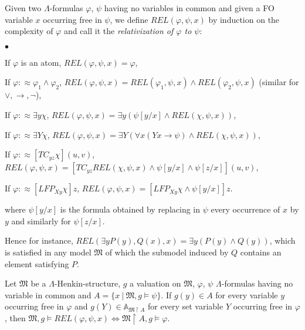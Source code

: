 \documentclass{LMCS}
\newcommand{\frM}{\mathfrak{M}}
\newcommand{\fo}{\textsf{FO}\xspace}
\begin{document}
\begin{defi}
Given two $\Lambda$-formulas $\varphi$, $\psi$ having no variables
in common and given a \fo variable $x$ occurring free in $\psi$,
we define $REL(\varphi,\psi,x)$ by induction on the complexity of
$\varphi$ and call it the \emph{relativization of $\varphi$ to
$\psi$}:
\begin{iteMize}{$\bullet$}
 \item If $\varphi$ is an atom, $REL(\varphi,\psi,x)=\varphi$,
 \item If $\varphi:\approx\varphi_1 \wedge \varphi_2$, $REL(\varphi,\psi,x)=REL(\varphi_1,\psi,x) \wedge REL(\varphi_2,\psi,x)$ (similar for $\vee, \rightarrow, \neg$),
 \item If $\varphi:\approx\exists y \chi$, $REL(\varphi,\psi,x)=\exists y (\psi[y/x] \land REL(\chi,\psi,x))$,
 \item If $\varphi:\approx\exists Y \chi$, $REL(\varphi,\psi,x)=\exists Y (\forall x(Yx \rightarrow \psi) \land REL(\chi,\psi,x))$,
 \item If $\varphi:\approx[TC_{yz}\chi](u,v)$,\\
  $REL(\varphi,\psi,x)=[TC_{yz} REL(\chi,\psi,x) \wedge \psi[y/x] \wedge \psi[z/x]](u,v)$,
 \item If $\varphi:\approx[LFP_{Xy}\chi]z$, $REL(\varphi,\psi,x)= [LFP_{Xy}\chi \wedge\psi[y/x]]z$.
\end{iteMize}
where $\psi[y/x]$ is the formula obtained by replacing in $\psi$ every occurrence of $x$ by $y$ and similarly for $\psi[z/x]$.
\end{defi}

Hence for instance, $REL(\exists y P(y),Q(x),x)=\exists y (P(y) \wedge Q(y))$, which is satisfied in any model $\frM$ of which the submodel induced by $Q$ contains an element satisfying $P$.


\begin{lem}
Let $\frM$ be a $\Lambda$-Henkin-structure, $g$ a valuation on
$\frM$, $\varphi$, $\psi$ $\Lambda$-formulas having no variable in common and $A=\{x ~|~ \frM,
g \models \psi\}$. If $g(y)\in A$ for every variable $y$ occurring
free in $\varphi$ and $g(Y) \in \mathbb{A}_{\frM \upharpoonright A}$ for every
set variable $Y$ occurring free in $\varphi$, then $\frM,g \models
REL(\varphi,\psi,x) \Leftrightarrow \frM \upharpoonright A, g
\models \varphi$. \label{rel}
\end{lem}
\end{document}
